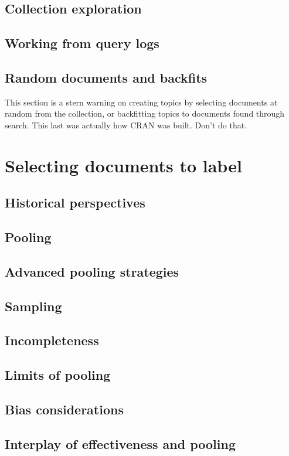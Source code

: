 \documentclass[nobib]{tufte-book}
\begin{document}
\section{Collection exploration}
\section{Working from query logs}
\section{Random documents and backfits}

This section is a stern warning on creating topics by selecting documents at random from the collection, or backfitting topics to documents found through search.  This last was actually how CRAN was built.  Don't do that.

\chapter{Selecting documents to label}

\section{Historical perspectives}
\section{Pooling}
\section{Advanced pooling strategies}
\section{Sampling}
\section{Incompleteness}
\section{Limits of pooling}
\section{Bias considerations}
\section{Interplay of effectiveness and pooling}
\end{document}
